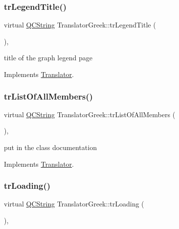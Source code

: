 \subsubsection{\texorpdfstring{trLegendTitle()}{trLegendTitle()}}
{\footnotesize\ttfamily virtual \mbox{\hyperlink{class_q_c_string}{Q\+C\+String}} Translator\+Greek\+::tr\+Legend\+Title (\begin{DoxyParamCaption}{ }\end{DoxyParamCaption})\hspace{0.3cm}{\ttfamily [inline]}, {\ttfamily [virtual]}}

title of the graph legend page 

Implements \mbox{\hyperlink{class_translator}{Translator}}.

\mbox{\label{class_translator_greek_ada67ff2f0fd9f989bcbf71163adff13b}} 
\subsubsection{\texorpdfstring{trListOfAllMembers()}{trListOfAllMembers()}}
{\footnotesize\ttfamily virtual \mbox{\hyperlink{class_q_c_string}{Q\+C\+String}} Translator\+Greek\+::tr\+List\+Of\+All\+Members (\begin{DoxyParamCaption}{ }\end{DoxyParamCaption})\hspace{0.3cm}{\ttfamily [inline]}, {\ttfamily [virtual]}}

put in the class documentation 

Implements \mbox{\hyperlink{class_translator}{Translator}}.

\mbox{\label{class_translator_greek_ac37245ea6f3ca1f99ef21838fafd97f6}} 
\subsubsection{\texorpdfstring{trLoading()}{trLoading()}}
{\footnotesize\ttfamily virtual \mbox{\hyperlink{class_q_c_string}{Q\+C\+String}} Translator\+Greek\+::tr\+Loading (\begin{DoxyParamCaption}{ }\end{DoxyParamCaption})\hspace{0.3cm}{\ttfamily [inline]}, {\ttfamily [virtual]}}

